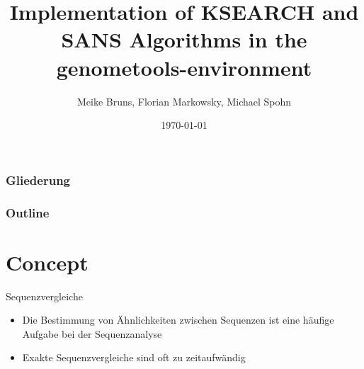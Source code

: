 \documentclass[aspectratio=1610]{beamer}
\author{Meike Bruns, Florian Markowsky, Michael Spohn}
\title{Implementation of KSEARCH and SANS Algorithms in the genometools-environment}
\date{\today}
\begin{document}
 {
  \begin{frame} 
    \frametitle{Gliederung}
  \end{frame}
}

\titlepage

\begin{frame}
	\frametitle{Outline}
	\tableofcontents
\end{frame}

\section{Concept}

%
%
\begin{frame}{Sequenzvergleiche}
  \begin{itemize}
    \item Die Bestimmung von Ähnlichkeiten zwischen Sequenzen ist eine häufige Aufgabe bei der Sequenzanalyse 
    \item Exakte Sequenzvergleiche sind oft zu zeitaufwändig
  \end{itemize}
\end{frame}
\end{document}

